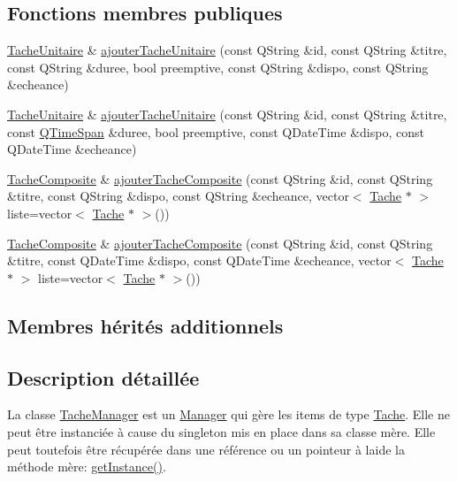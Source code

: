 \subsection*{Fonctions membres publiques}
\begin{DoxyCompactItemize}
\item 
\hyperlink{class_tache_unitaire}{Tache\+Unitaire} \& \hyperlink{class_tache_manager_aa9a015186cb6f439cc035a451d49ee90}{ajouter\+Tache\+Unitaire} (const Q\+String \&id, const Q\+String \&titre, const Q\+String \&duree, bool preemptive, const Q\+String \&dispo, const Q\+String \&echeance)
\item 
\hyperlink{class_tache_unitaire}{Tache\+Unitaire} \& \hyperlink{class_tache_manager_ab15a1f68d9e0c82d01d4751c954ddbf4}{ajouter\+Tache\+Unitaire} (const Q\+String \&id, const Q\+String \&titre, const \hyperlink{class_q_time_span}{Q\+Time\+Span} \&duree, bool preemptive, const Q\+Date\+Time \&dispo, const Q\+Date\+Time \&echeance)
\item 
\hyperlink{class_tache_composite}{Tache\+Composite} \& \hyperlink{class_tache_manager_aa8ab42b1e37f0a4965d836dd0ce22068}{ajouter\+Tache\+Composite} (const Q\+String \&id, const Q\+String \&titre, const Q\+String \&dispo, const Q\+String \&echeance, vector$<$ \hyperlink{class_tache}{Tache} $\ast$ $>$ liste=vector$<$ \hyperlink{class_tache}{Tache} $\ast$ $>$())
\item 
\hyperlink{class_tache_composite}{Tache\+Composite} \& \hyperlink{class_tache_manager_a27341ce34b6acd764275307e4d2eeeff}{ajouter\+Tache\+Composite} (const Q\+String \&id, const Q\+String \&titre, const Q\+Date\+Time \&dispo, const Q\+Date\+Time \&echeance, vector$<$ \hyperlink{class_tache}{Tache} $\ast$ $>$ liste=vector$<$ \hyperlink{class_tache}{Tache} $\ast$ $>$())
\end{DoxyCompactItemize}
\subsection*{Membres hérités additionnels}


\subsection{Description détaillée}
La classe \hyperlink{class_tache_manager}{Tache\+Manager} est un \hyperlink{class_manager}{Manager} qui gère les items de type \hyperlink{class_tache}{Tache}. Elle ne peut être instanciée à cause du singleton mis en place dans sa classe mère. Elle peut toutefois être récupérée dans une référence ou un pointeur à l\textquotesingle{}aide la méthode mère\+: \hyperlink{class_manager_a8372e4f1e14f3605a57d839b152325ed}{get\+Instance()}. 


